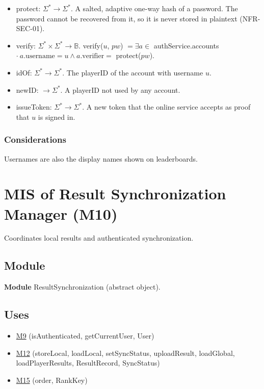 \documentclass[12pt, titlepage]{article}
\newcommand{\Mref}[1]{\hyperref[sec:M#1]{M#1}}
\begin{document}
\begin{itemize}
\item protect: $\Sigma^* \rightarrow \Sigma^*$. A salted, adaptive one-way hash
  of a password. The password cannot be recovered from it, so it is never
  stored in plaintext (NFR-SEC-01).
\item verify: $\Sigma^* \times \Sigma^* \rightarrow \mathbb{B}$. verify($u$,
  $pw$) $= \exists a \in$ authService.accounts $\cdot\ a.\text{username} = u
  \wedge a.\text{verifier} =$ protect($pw$).
\item idOf: $\Sigma^* \rightarrow \Sigma^*$. The playerID of the account with
  username $u$.
\item newID: $\rightarrow \Sigma^*$. A playerID not used by any account.
\item issueToken: $\Sigma^* \rightarrow \Sigma^*$. A new token that the online
  service accepts as proof that $u$ is signed in.
\end{itemize}

\subsubsection{Considerations}

Usernames are also the display names shown on leaderboards.

\newpage
\section{MIS of Result Synchronization Manager (M10)} \label{sec:M10}

Coordinates local results and authenticated synchronization.

\subsection{Module}

\textbf{Module} ResultSynchronization (abstract object).

\subsection{Uses}

\begin{itemize}
\item \Mref{9} (isAuthenticated, getCurrentUser, User)
\item \Mref{12} (storeLocal, loadLocal, setSyncStatus, uploadResult,
  loadGlobal, loadPlayerResults, ResultRecord, SyncStatus)
\item \Mref{15} (order, RankKey)
\end{itemize}
\end{document}

